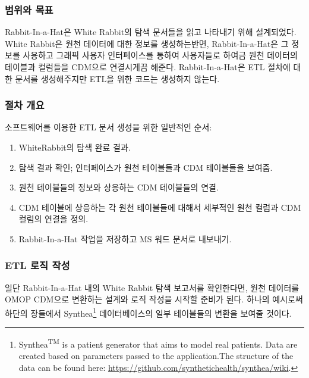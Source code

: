 \documentclass[11pt]{book}
\providecommand{\tightlist}{%
  \setlength{\itemsep}{0pt}\setlength{\parskip}{0pt}}
\let\rmarkdownfootnote\footnote%
\def\footnote{\protect\rmarkdownfootnote}
\theoremstyle{definition}
\theoremstyle{definition}
\theoremstyle{definition}
\theoremstyle{remark}
\begin{document}
\subsubsection*{범위와 목표}\label{--1}

Rabbit-In-a-Hat은 White Rabbit의 탐색 문서들을 읽고 나타내기 위해
설계되었다. White Rabbit은 원천 데이터에 대한 정보를 생성하는반면,
Rabbit-In-a-Hat은 그 정보를 사용하고 그래픽 사용자 인터페이스를 통하여
사용자들로 하여금 원천 데이터의 테이블과 컬럼들을 CDM으로 연결시게끔
해준다. Rabbit-In-a-Hat은 ETL 절차에 대한 문서를 생성해주지만 ETL을 위한
코드는 생성하지 않는다.

\subsubsection*{절차 개요}\label{--1}

소프트웨어를 이용한 ETL 문서 생성을 위한 일반적인 순서:

\begin{enumerate}
\def\labelenumi{\arabic{enumi}.}
\tightlist
\item
  WhiteRabbit의 탐색 완료 결과.
\item
  탐색 결과 확인; 인터페이스가 원천 테이블들과 CDM 테이블들을 보여줌.
\item
  원천 테이블들의 정보와 상응하는 CDM 테이블들의 연결.
\item
  CDM 테이블에 상응하는 각 원천 테이블들에 대해서 세부적인 원천 컬럼과
  CDM 컬럼의 연결을 정의.
\item
  Rabbit-In-a-Hat 작업을 저장하고 MS 워드 문서로 내보내기.
\end{enumerate}

\subsubsection*{ETL 로직 작성}\label{etl--}

일단 Rabbit-In-a-Hat 내의 White Rabbit 탐색 보고서를 확인한다면, 원천
데이터를 OMOP CDM으로 변환하는 설계와 로직 작성을 시작할 준비가 된다.
하나의 예시로써 하단의 장들에서 Synthea\footnote{Synthea\textsuperscript{TM}
  is a patient generator that aims to model real patients. Data are
  created based on parameters passed to the application.The structure of
  the data can be found here:
  \url{https://github.com/synthetichealth/synthea/wiki}.} 데이터베이스의
일부 테이블들의 변환을 보여줄 것이다.
\end{document}
